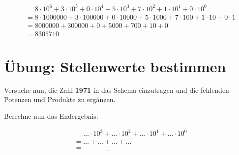 \documentclass{article}
\begin{document}
\begin{center}
\begin{align*}
  &\phantom{= } 8 \cdot 10^6 + 3 \cdot 10^5 + 0 \cdot 10^4 + 5 \cdot 10^3 + 7 \cdot 10^2 + 1 \cdot 10^1 + 0 \cdot 10^0 \\
  &= 8 \cdot 1000000 + 3 \cdot 100000 + 0 \cdot 10000 + 5 \cdot 1000 + 7 \cdot 100 + 1 \cdot 10 + 0 \cdot 1 \\
  &= 8000000 + 300000 + 0 + 5000 + 700 + 10 + 0 \\
  &= 8305710
\end{align*}
\end{center}

\section*{Übung: Stellenwerte bestimmen}
Versuche nun, die Zahl \textbf{1971} in das Schema einzutragen und die fehlenden Potenzen und Produkte zu ergänzen.

\vspace{0.5cm}

\begin{center}
\end{center}

\vspace{0.8cm}
Berechne nun das Endergebnis:
\begin{center}
\begin{align*}
  &\phantom{= } \dots \cdot 10^3 + \dots \cdot 10^2 + \dots \cdot 10^1 + \dots \cdot 10^0 \\
  &= \dots + \dots + \dots + \dots \\
  &= \underline{\hspace{3cm}}
\end{align*}
\end{center}
\end{document}

